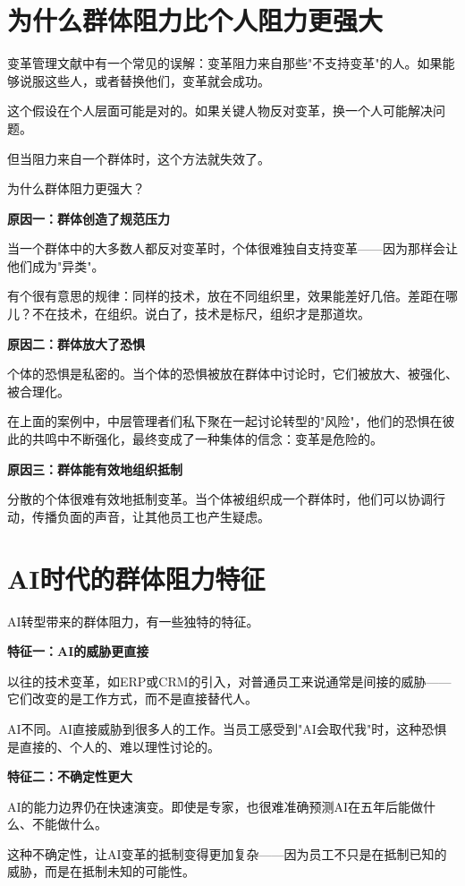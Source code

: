 \section{为什么群体阻力比个人阻力更强大}


变革管理文献中有一个常见的误解：变革阻力来自那些"不支持变革"的人。如果能够说服这些人，或者替换他们，变革就会成功。

这个假设在个人层面可能是对的。如果关键人物反对变革，换一个人可能解决问题。

但当阻力来自一个群体时，这个方法就失效了。

为什么群体阻力更强大？

\textbf{原因一：群体创造了规范压力}

当一个群体中的大多数人都反对变革时，个体很难独自支持变革——因为那样会让他们成为"异类"。

有个很有意思的规律：同样的技术，放在不同组织里，效果能差好几倍。差距在哪儿？不在技术，在组织。说白了，技术是标尺，组织才是那道坎。

\textbf{原因二：群体放大了恐惧}

个体的恐惧是私密的。当个体的恐惧被放在群体中讨论时，它们被放大、被强化、被合理化。

在上面的案例中，中层管理者们私下聚在一起讨论转型的"风险"，他们的恐惧在彼此的共鸣中不断强化，最终变成了一种集体的信念：变革是危险的。

\textbf{原因三：群体能有效地组织抵制}

分散的个体很难有效地抵制变革。当个体被组织成一个群体时，他们可以协调行动，传播负面的声音，让其他员工也产生疑虑。

\section{AI时代的群体阻力特征}


AI转型带来的群体阻力，有一些独特的特征。

\textbf{特征一：AI的威胁更直接}

以往的技术变革，如ERP或CRM的引入，对普通员工来说通常是间接的威胁——它们改变的是工作方式，而不是直接替代人。

AI不同。AI直接威胁到很多人的工作。当员工感受到"AI会取代我"时，这种恐惧是直接的、个人的、难以理性讨论的。

\textbf{特征二：不确定性更大}

AI的能力边界仍在快速演变。即使是专家，也很难准确预测AI在五年后能做什么、不能做什么。

这种不确定性，让AI变革的抵制变得更加复杂——因为员工不只是在抵制已知的威胁，而是在抵制未知的可能性。

